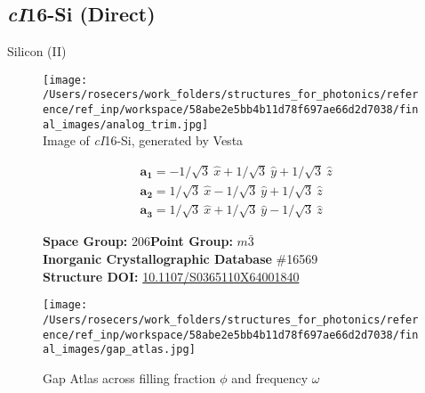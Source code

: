 \subsection{\large{\textit{cI}16-Si (Direct)}}\vspace{-0.1in}
Silicon (II)


\begin{figure}[H]
\begin{minipage}{0.34\textwidth}\centering
\texttt{[image: /Users/rosecers/work\_folders/structures\_for\_photonics/reference/ref\_inp/workspace/58abe2e5bb4b11d78f697ae66d2d7038/final\_images/analog\_trim.jpg]}\\
\small{Image of \textit{cI}16-Si, generated by Vesta}
\end{minipage}\hfill
\begin{minipage}{0.65\textwidth}\raggedright
{\setlength{\mathindent}{0cm}
\begin{equation*}
\begin{split}&\boldsymbol{a_1} = -1/\sqrt{3}\ \hat{x} + 1/\sqrt{3}\ \hat{y} + 1/\sqrt{3}\ \hat{z}\\[-8pt]
&\boldsymbol{a_2} = 1/\sqrt{3}\ \hat{x} - 1/\sqrt{3}\ \hat{y} + 1/\sqrt{3}\ \hat{z}\\[-8pt]
&\boldsymbol{a_3} = 1/\sqrt{3}\ \hat{x} + 1/\sqrt{3}\ \hat{y} - 1/\sqrt{3}\ \hat{z}
\end{split}
\end{equation*}}

\textbf{Space Group:}	206\hspace{0.5in}\textbf{Point Group:}	$m\bar{3}$\\
\textbf{Inorganic Crystallographic Database} \#16569\\
\textbf{Structure DOI: }\url{10.1107/S0365110X64001840}

\end{minipage}\hfill
\end{figure}
\vspace{-0.25in}


\begin{figure}[H]
\begin{minipage}{0.9\textwidth}\centering
\texttt{[image: /Users/rosecers/work\_folders/structures\_for\_photonics/reference/ref\_inp/workspace/58abe2e5bb4b11d78f697ae66d2d7038/final\_images/gap\_atlas.jpg]}
\\
\end{minipage}\hfill\caption{Gap Atlas across filling fraction $\phi$ and frequency $\omega$}
\end{figure}


